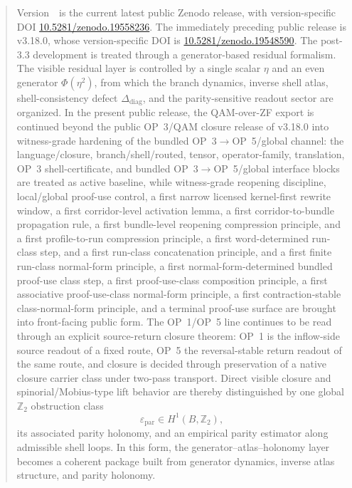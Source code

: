 \begin{abstract}
Version~\docversion\ is the current latest public Zenodo release, with version-specific DOI \href{https://doi.org/10.5281/zenodo.19558236}{10.5281/zenodo.19558236}. The immediately preceding public release is v3.18.0, whose version-specific DOI is \href{https://doi.org/10.5281/zenodo.19548590}{10.5281/zenodo.19548590}. The post-3.3 development is treated through a generator-based residual formalism. The visible residual layer is controlled by a single scalar $\eta$ and an even generator $\Phi(\eta^2)$, from which the branch dynamics, inverse shell atlas, shell-consistency defect $\Delta_{\mathrm{diag}}$, and the parity-sensitive readout sector are organized. In the present public release, the QAM-over-ZF export is continued beyond the public OP~3/QAM closure release of v3.18.0 into witness-grade hardening of the bundled OP~3$\to$OP~5/global channel: the language/closure, branch/shell/routed, tensor, operator-family, translation, OP~3 shell-certificate, and bundled OP~3$\to$OP~5/global interface blocks are treated as active baseline, while witness-grade reopening discipline, local/global proof-use control, a first narrow licensed kernel-first rewrite window, a first corridor-level activation lemma, a first corridor-to-bundle propagation rule, a first bundle-level reopening compression principle, and a first profile-to-run compression principle, a first word-determined run-class step, and a first run-class concatenation principle, and a first finite run-class normal-form principle, a first normal-form-determined bundled proof-use class step, a first proof-use-class composition principle, a first associative proof-use-class normal-form principle, a first contraction-stable class-normal-form principle, and a terminal proof-use surface are brought into front-facing public form. The OP~1/OP~5 line continues to be read through an explicit source-return closure theorem: OP~1 is the inflow-side source readout of a fixed route, OP~5 the reversal-stable return readout of the same route, and closure is decided through preservation of a native closure carrier class under two-pass transport. Direct visible closure and spinorial/Mobius-type lift behavior are thereby distinguished by one global $\mathbb{Z}_2$ obstruction class
\[
\varepsilon_{\mathrm{par}}\in H^1(B,\mathbb{Z}_2),
\]
its associated parity holonomy, and an empirical parity estimator along admissible shell loops. In this form, the generator--atlas--holonomy layer becomes a coherent package built from generator dynamics, inverse atlas structure, and parity holonomy.


\end{abstract}
